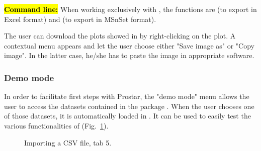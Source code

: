 \documentclass[12pt]{article}
\begin{document}

\hl{\bf Command line:} When working exclusively with , the 
functions are  (to export in Excel format) 
and  (to export in MSnSet format).


{The user can download the plots showed in  by 
right-clicking on the plot. A contextual menu appears and let the user 
choose either "Save image as" or "Copy image". In the latter case, he/she has 
to paste the image in appropriate software.}

\subsubsection{Demo mode} \label{sec:demomode}

In order to facilitate first steps with Prostar, the "demo mode" menu allows 
the user to access the datasets contained in the package . 
When the user chooses one of those datasets, it is automatically loaded in 
. It can be used to easily test the various functionalities of
 (Fig.~\ref{fig:demomodeFig}).



\begin {figure}
\centering
{}
\caption{Importing a CSV file, tab 5.}\label{fig:demomodeFig}
\end {figure}
\end{document}
